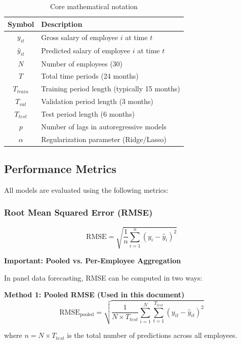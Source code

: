 \documentclass[12pt,a4paper]{article}
\begin{document}
\begin{table}[H]
\centering
\begin{tabular}{cl}
\toprule
\textbf{Symbol} & \textbf{Description} \\
\midrule
$y_{it}$ & Gross salary of employee $i$ at time $t$ \\
$\hat{y}_{it}$ & Predicted salary of employee $i$ at time $t$ \\
$N$ & Number of employees (30) \\
$T$ & Total time periods (24 months) \\
$T_{train}$ & Training period length (typically 15 months) \\
$T_{val}$ & Validation period length (3 months) \\
$T_{test}$ & Test period length (6 months) \\
$p$ & Number of lags in autoregressive models \\
$\alpha$ & Regularization parameter (Ridge/Lasso) \\
\bottomrule
\end{tabular}
\caption{Core mathematical notation}
\end{table}

\subsection{Performance Metrics}

All models are evaluated using the following metrics:

\subsubsection{Root Mean Squared Error (RMSE)}
\begin{equation}
\text{RMSE} = \sqrt{\frac{1}{n}\sum_{i=1}^{n}(y_i - \hat{y}_i)^2}
\end{equation}

\textbf{Important: Pooled vs. Per-Employee Aggregation}

In panel data forecasting, RMSE can be computed in two ways:

\textbf{Method 1: Pooled RMSE (Used in this document)}
\begin{equation}
\text{RMSE}_{\text{pooled}} = \sqrt{\frac{1}{N \times T_{test}}\sum_{i=1}^{N}\sum_{t=1}^{T_{test}}(y_{it} - \hat{y}_{it})^2}
\end{equation}

where $n = N \times T_{test}$ is the total number of predictions across all employees.
\end{document}
